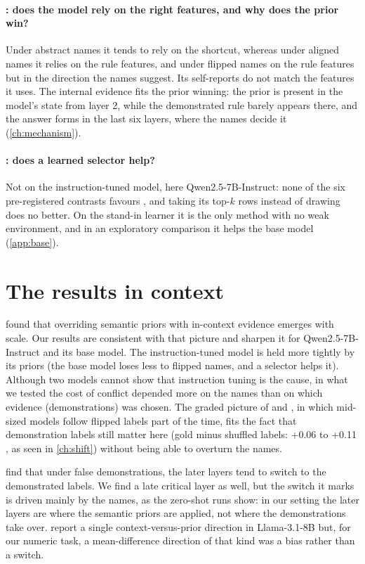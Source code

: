 \paragraph{: does the model rely on the right features, and why does the prior win?}

Under abstract names it tends to rely on the shortcut, whereas under aligned names it relies on the rule features, and under flipped names on the rule features but in the direction the names suggest. Its self-reports do not match the features it uses. The internal evidence fits the prior winning: the prior is present in the model's state from layer 2, while the demonstrated rule barely appears there, and the answer forms in the last six layers, where the names decide it (\autoref{ch:mechanism}).

\paragraph{: does a learned selector help?}
Not on the instruction-tuned model, here Qwen2.5-7B-Instruct: none of the six pre-registered contrasts favours \sata, and taking its top-$k$ rows instead of drawing does no better. On the stand-in learner it is the only method with no weak environment, and in an exploratory comparison it helps the base model (\autoref{app:base}).

\section{The results in context}
\citet{wei2023larger} found that overriding semantic priors with in-context evidence emerges with scale. Our results are consistent with that picture and sharpen it for Qwen2.5-7B-Instruct and its base model. The instruction-tuned model is held more tightly by its priors (the base model loses less to flipped names, and a selector helps it). Although two models cannot show that instruction tuning is the cause, in what we tested the cost of conflict depended more on the names than on which evidence (demonstrations) was chosen. The graded picture of \citet{krishnakumar2025semantic} and \citet{kossen2024incontext}, in which mid-sized models follow flipped labels part of the time, fits the fact that demonstration labels still matter here (gold minus shuffled labels: +0.06 to +0.11 \AUROC, as seen in \autoref{ch:shift}) without being able to overturn the names.

\citet{halawi2024overthinking} find that under false demonstrations, the later layers tend to switch to the demonstrated labels. We find a late critical layer as well, but the switch it marks is driven mainly by the names, as the zero-shot runs show: in our setting the later layers are where the semantic priors are applied, not where the demonstrations take over. \citet{minder2025controllable} report a single context-versus-prior direction in Llama-3.1-8B but, for our numeric task, a mean-difference direction of that kind was a bias rather than a switch.

